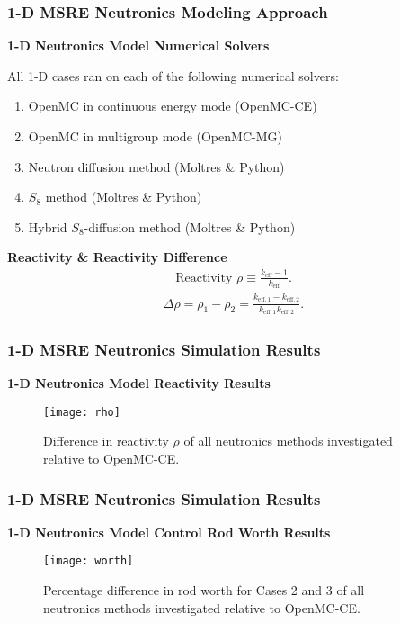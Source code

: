 \begin{frame}
  \frametitle{1-D MSRE Neutronics Modeling Approach}
  \textbf{1-D Neutronics Model Numerical Solvers}
  \vspace{.2cm}

  All 1-D cases ran on each of the following numerical solvers:
  \begin{enumerate}
    \item OpenMC in continuous energy mode (OpenMC-CE)
    \item OpenMC in multigroup mode (OpenMC-MG)
    \item Neutron diffusion method (Moltres \& Python)
    \item $S_8$ method (Moltres \& Python)
    \item Hybrid $S_8$-diffusion method (Moltres \& Python)
  \end{enumerate}
  \vspace{.2cm}

  \textbf{Reactivity \& Reactivity Difference}
  \begin{gather}
    \mbox{Reactivity } \rho \equiv \frac{k_\text{eff}-1}{k_\text{eff}}.
  \end{gather}
  \begin{gather}
    \Delta\rho = \rho_1 - \rho_2 =
    \frac{k_{\text{eff},1}-k_{\text{eff},2}}{k_{\text{eff},1}k_{\text{eff},2}}.
  \end{gather}
\end{frame}

\begin{frame}
  \frametitle{1-D MSRE Neutronics Simulation Results}
  \textbf{1-D Neutronics Model Reactivity Results}
  \begin{figure}[h]
    \centering
    \texttt{[image: rho]}
    \caption{Difference in reactivity $\rho$ of all neutronics methods investigated relative
    to OpenMC-CE.}
    \label{fig:1d-rho}
  \end{figure}
\end{frame}

\begin{frame}
  \frametitle{1-D MSRE Neutronics Simulation Results}
  \textbf{1-D Neutronics Model Control Rod Worth Results}
  \begin{figure}[h]
    \centering
    \texttt{[image: worth]}
    \caption{Percentage difference in rod worth for Cases 2 and 3 of all neutronics methods
    investigated relative to OpenMC-CE.}
    \label{fig:1d-worth}
  \end{figure}
\end{frame}

